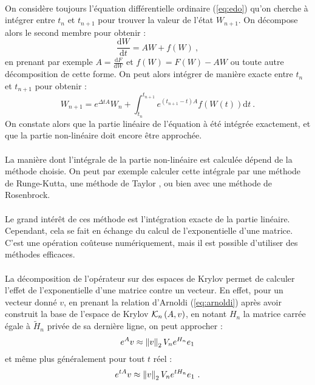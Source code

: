     \paragraph{}
    On considère toujours l'équation différentielle ordinaire (\ref{eq:edo}) qu'on cherche à intégrer entre $t_n$ et $t_{n+1}$ pour trouver la valeur de l'état $W_{n+1}$.
    On décompose alors le second membre pour obtenir :
    \[\frac{\mathrm{d}W}{\mathrm{d}t} = AW + f\left(W\right)\ ,\]
    en prenant par exemple $A = \frac{\mathrm{d}F}{\mathrm{d}W}$ et $f\left(W\right) = F\left(W\right) - AW$ ou toute autre décomposition de cette forme.
    On peut alors intégrer de manière exacte entre $t_n$ et $t_{n+1}$ pour obtenir :
    \[W_{n+1} = e^{\Delta tA}W_n + \int_{t_n}^{t_{n+1}}e^{\left(t_{n+1}-t\right)A}f\left(W\left(t\right)\right)\mathrm{d}t\ .\]
    On constate alors que la partie linéaire de l'équation à été intégrée exactement, et que la partie non-linéaire doit encore être approchée.

    \paragraph{}
    La manière dont l'intégrale de la partie non-linéaire est calculée dépend de la méthode choisie.
    On peut par exemple calculer cette intégrale par une méthode de Runge-Kutta, une méthode de Taylor \cite{KoskelaOstermann2013}, ou bien avec une méthode de Rosenbrock.

    \paragraph{}
    Le grand intérêt de ces méthode est l'intégration exacte de la partie linéaire.
    Cependant, cela se fait en échange du calcul de l'exponentielle d'une matrice.
    C'est une opération coûteuse numériquement, mais il est possible d'utiliser des méthodes efficaces.

    \paragraph{}
    La décomposition de l'opérateur sur des espaces de Krylov permet de calculer l'effet de l'exponentielle d'une matrice contre un vecteur.
    En effet, pour un vecteur donné $v$, en prenant la relation d'Arnoldi (\ref{eq:arnoldi}) après avoir construit la base de l'espace de Krylov $\krylov[A, v]{n}$, en notant $H_n$ la matrice carrée égale à $\widetilde{H}_n$ privée de sa dernière ligne, on peut approcher \cite{Saad1992} :
    \[e^Av \approx \norm[2]{v} V_ne^{H_n}e_1\]
    et même plus généralement pour tout $t$ réel :
    \[e^{tA}v \approx \norm[2]{v} V_ne^{tH_n}e_1\ .\]

